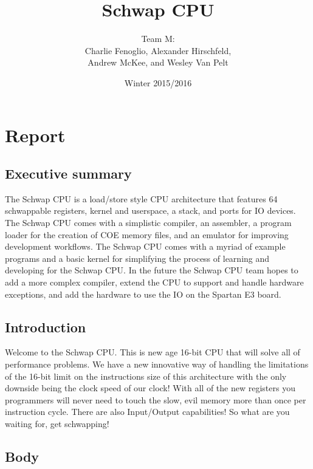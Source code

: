 \documentclass{report}
\title{Schwap CPU}
\author{Team M: \\ Charlie Fenoglio, Alexander Hirschfeld, \\ Andrew McKee, and Wesley Van Pelt}
\date{Winter 2015/2016}
\begin{document}
\maketitle
\setcounter{tocdepth}{4}
\tableofcontents

\chapter{Report}
	\section{Executive summary}
		The Schwap CPU is a load/store style CPU architecture that features 64 schwappable registers, kernel and userspace, a stack, and ports for IO devices. The Schwap CPU comes with a simplistic compiler, an assembler, a program loader for the creation of COE memory files, and an emulator for improving development workflows. The Schwap CPU comes with a myriad of example programs and a basic kernel for simplifying the process of learning and developing for the Schwap CPU. In the future the Schwap CPU team hopes to add a more complex compiler, extend the CPU to support and handle hardware exceptions, and add the hardware to use the IO on the Spartan E3 board.
	\section{Introduction}
		Welcome to the Schwap CPU.  This is new age 16-bit CPU that will solve all of performance problems.  We have a new innovative way of handling the limitations of the 16-bit limit on the instructions size of this architecture with the only downside being the clock speed of our clock! With all of the new registers you programmers will never need to touch the slow, evil memory more than once per instruction cycle. There are also Input/Output capabilities! So what are you waiting for, get schwapping!
	\section{Body}
\end{document}

